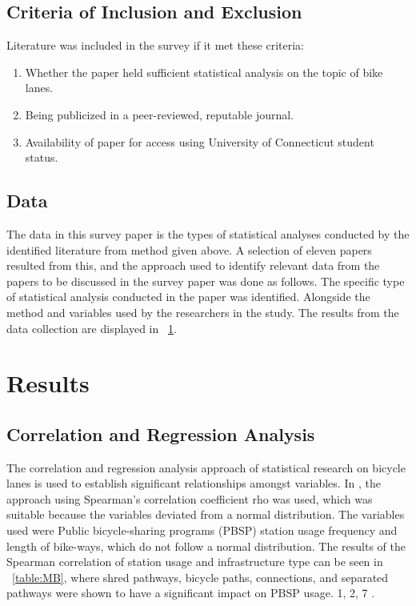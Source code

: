 \documentclass[12pt, letterpaper]{article}
\begin{document}
\subsection{Criteria of Inclusion and Exclusion}
\label{sec:inc}

Literature was included in the survey if it met these criteria:

\begin{enumerate}
        \item Whether the paper held sufficient statistical analysis on the topic of bike lanes. 
        \item Being publicized in a peer-reviewed, reputable journal.
        \item Availability of paper for access using University of Connecticut student status. 
\end{enumerate}

\subsection{Data}
\label{sec:data}

The data in this survey paper is the types of statistical analyses conducted by the identified literature from method given above. A selection of eleven papers resulted from this, and the approach used to identify relevant data from the papers to be discussed in the survey paper was done as follows. The specific type of statistical analysis conducted in the paper was identified. Alongside the method and variables used by the researchers in the study. The results from the data collection are displayed in ~\ref{sec:results}. 

\section{Results}
\label{sec:results}

\subsection{Correlation and Regression Analysis}
\label{sec:corr}

The correlation and regression analysis approach of statistical research on bicycle lanes is used to establish significant relationships amongst variables. In \citet{1MateoBabiano2016}, the approach using Spearman's correlation coefficient rho was used, which was suitable because the variables deviated from a normal distribution. The variables used were Public bicycle-sharing programs (PBSP) station usage frequency and length of bike-ways, which do not follow a normal distribution. The results of the Spearman correlation of station usage and infrastructure type can be seen in ~\ref{table:MB}, where shred pathways, bicycle paths, connections, and separated pathways were shown to have a significant impact on PBSP usage. 
1, 2, 7 .
\end{document}
